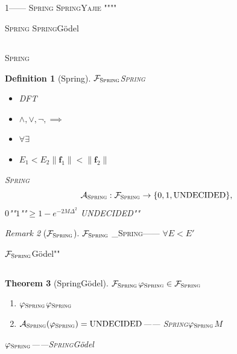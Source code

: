 \documentclass[12pt,a4paper]{article}
\newtheorem{theorem}{Theorem}[section]
\newtheorem{definition}[theorem]{Definition}
\theoremstyle{remark}
\newtheorem{remark}[theorem]{Remark}
\newcommand{\Fset}{\mathcal{F}}
\newcommand{\Spring}{\textsc{Spring}}
\newcommand{\Yajie}{\textsc{Yajie}}
\begin{document}
\subsection{}

1——
\Spring{}\textbf{}
\Spring{}\Yajie{}
""""

\Spring{}\textbf{}
\Spring{}G\"odel

\subsection{}

\Spring{}

\begin{definition}[Spring]\label{def:formal_system}
$\Fset_{\Spring}$\Spring{}
\begin{itemize}[itemsep=2pt]
    \item DFT
    \item $\land, \lor, \neg, \implies$
    \item $\forall$$\exists$
    \item $E_1 < E_2$$\|\mathbf{f}_1\| < \|\mathbf{f}_2\|$
\end{itemize}
\Spring{}
\begin{equation}
    \mathcal{A}_{\Spring}: \Fset_{\Spring} \to \{0, 1, \text{UNDECIDED}\},
\end{equation}
$0$""$1$""$\geq 1-e^{-2M\Delta^2}$
\textsc{UNDECIDED}""
\end{definition}

\begin{remark}[$\Fset_{\Spring}$]
$\Fset_{\Spring}$
\Fset_{\Spring}——
$\forall$$E < E'$

$\Fset_{\Spring}$G\"odel""
\end{remark}

\subsection{}

\begin{theorem}[SpringG\"odel]\label{thm:godel_boundary}
$\Fset_{\Spring}$$\varphi_{\Spring} \in \Fset_{\Spring}$

\begin{enumerate}[label=(\roman*), itemsep=3pt]
    \item $\varphi_{\Spring}$$\varphi_{\Spring}$
    \item $\mathcal{A}_{\Spring}(\varphi_{\Spring}) = \text{UNDECIDED}$——
    \Spring{}$\varphi_{\Spring}$$M$
\end{enumerate}
$\varphi_{\Spring}$——\Spring{}G\"odel
\end{theorem}
\end{document}
